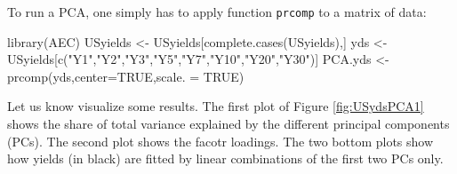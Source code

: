 \documentclass[
  12pt,
]{book}
\newenvironment{Shaded}{\begin{snugshade}}{\end{snugshade}}
\newcommand{\AttributeTok}[1]{\textcolor[rgb]{0.77,0.63,0.00}{#1}}
\newcommand{\ConstantTok}[1]{\textcolor[rgb]{0.00,0.00,0.00}{#1}}
\newcommand{\FunctionTok}[1]{\textcolor[rgb]{0.00,0.00,0.00}{#1}}
\newcommand{\NormalTok}[1]{#1}
\newcommand{\OtherTok}[1]{\textcolor[rgb]{0.56,0.35,0.01}{#1}}
\newcommand{\StringTok}[1]{\textcolor[rgb]{0.31,0.60,0.02}{#1}}
\theoremstyle{definition}
\theoremstyle{definition}
\theoremstyle{definition}
\theoremstyle{definition}
\theoremstyle{remark}
\begin{document}
To run a PCA, one simply has to apply function \texttt{prcomp} to a matrix of data:

\begin{Shaded}
\begin{Highlighting}[]
\FunctionTok{library}\NormalTok{(AEC)}
\NormalTok{USyields }\OtherTok{\textless{}{-}}\NormalTok{ USyields[}\FunctionTok{complete.cases}\NormalTok{(USyields),]}
\NormalTok{yds }\OtherTok{\textless{}{-}}\NormalTok{ USyields[}\FunctionTok{c}\NormalTok{(}\StringTok{"Y1"}\NormalTok{,}\StringTok{"Y2"}\NormalTok{,}\StringTok{"Y3"}\NormalTok{,}\StringTok{"Y5"}\NormalTok{,}\StringTok{"Y7"}\NormalTok{,}\StringTok{"Y10"}\NormalTok{,}\StringTok{"Y20"}\NormalTok{,}\StringTok{"Y30"}\NormalTok{)]}
\NormalTok{PCA.yds }\OtherTok{\textless{}{-}} \FunctionTok{prcomp}\NormalTok{(yds,}\AttributeTok{center=}\ConstantTok{TRUE}\NormalTok{,}\AttributeTok{scale. =} \ConstantTok{TRUE}\NormalTok{)}
\end{Highlighting}
\end{Shaded}

Let us know visualize some results. The first plot of Figure \ref{fig:USydsPCA1} shows the share of total variance explained by the different principal components (PCs). The second plot shows the facotr loadings. The two bottom plots show how yields (in black) are fitted by linear combinations of the first two PCs only.
\end{document}
